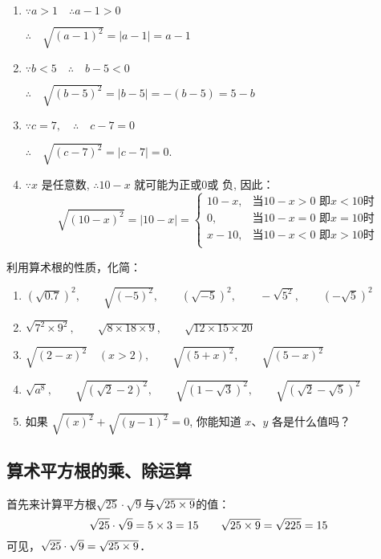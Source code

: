 \begin{solution}
\begin{enumerate}
    \item $\because a>1 \quad \therefore a-1>0$
    
    $\therefore \quad \sqrt{(a-1)^{2}}=|a-1|=a-1$
    \item   $\because b<5 \quad \therefore \quad b-5<0$
    
    $\therefore \quad \sqrt{(b-5)^{2}}=|b-5|=-(b-5)=5-b$

    \item  $\because c=7, \quad \therefore \quad c-7=0$
    
    $\therefore \quad \sqrt{(c-7)^{2}}=|c-7|=0$.

    \item  $\because x$ 是任意数, $\therefore 10-x$ 就可能为正或0或
    负, 因此：
\[\sqrt{(10-x)^2}=|10-x|=\begin{cases}
    10-x,& \text{当$10-x>0$ 即$x<10$时}\\
    0,&\text{当$10-x=0$ 即$x=10$时}\\
    x-10,&\text{当$10-x<0$ 即$x>10$时}\\
\end{cases} \]
\end{enumerate}
\end{solution}

\begin{ex}
    利用算术根的性质，化简：
\begin{enumerate}
    \item $(\sqrt{0.7})^{2},\qquad \sqrt{(-5)^{2}}, \qquad(\sqrt{-5})^{2},\qquad -\sqrt{5^{2}},\qquad (-\sqrt{5})^{2}$
    \item $\sqrt{7^{2} \times 9^{2}},\qquad \sqrt{8 \times 18 \times 9},\qquad \sqrt{12 \times 15 \times 20}$
    \item $\sqrt{(2-x)^{2}}\quad (x>2),\qquad \sqrt{(5+x)^{2}},\qquad \sqrt{(5-x)^{2}}$
    \item  $\sqrt{a^{8}},\qquad \sqrt{(\sqrt{2}-2)^{2}},\qquad \sqrt{(1-\sqrt{3})^{2}},\qquad \sqrt{(\sqrt{2}-\sqrt{5})^{2}}$
    \item 如果 $\sqrt{(x)^{2}}+\sqrt{(y-1)^{2}}=0$, 你能知道 $x$、$y$ 各是什么值吗？
\end{enumerate}
\end{ex}
    
\subsection{算术平方根的乘、除运算}
首先来计算平方根$\sqrt{25}\cdot \sqrt{9}$与$\sqrt{25\times9}$的值：
$$\sqrt{25}\cdot \sqrt{9}=5\times3=15\qquad \sqrt{25\times9}=\sqrt{225}=15$$
可见，$\sqrt{25}\cdot \sqrt{9}=\sqrt{25\times9}$．

